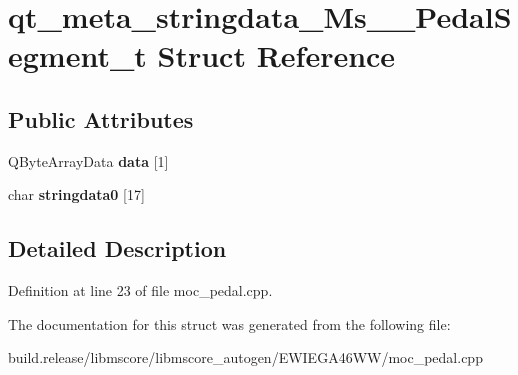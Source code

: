 \hypertarget{structqt__meta__stringdata___ms_____pedal_segment__t}{}\section{qt\+\_\+meta\+\_\+stringdata\+\_\+\+Ms\+\_\+\+\_\+\+Pedal\+Segment\+\_\+t Struct Reference}
\label{structqt__meta__stringdata___ms_____pedal_segment__t}
\subsection*{Public Attributes}
\begin{DoxyCompactItemize}
\item 
\mbox{\label{structqt__meta__stringdata___ms_____pedal_segment__t_a9e0ce74bb919944f528c24b6ad90114b}} 
Q\+Byte\+Array\+Data {\bfseries data} \mbox{[}1\mbox{]}
\item 
\mbox{\label{structqt__meta__stringdata___ms_____pedal_segment__t_a9b37984036beb56fc8f2fd0233ea7c88}} 
char {\bfseries stringdata0} \mbox{[}17\mbox{]}
\end{DoxyCompactItemize}


\subsection{Detailed Description}


Definition at line 23 of file moc\+\_\+pedal.\+cpp.



The documentation for this struct was generated from the following file\+:\begin{DoxyCompactItemize}
\item 
build.\+release/libmscore/libmscore\+\_\+autogen/\+E\+W\+I\+E\+G\+A46\+W\+W/moc\+\_\+pedal.\+cpp\end{DoxyCompactItemize}
